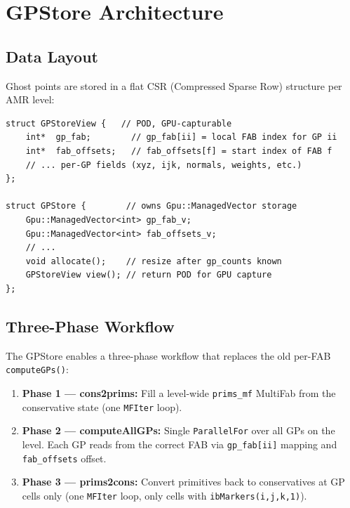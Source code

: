 \documentclass[11pt,a4paper]{article}
\begin{document}
\section{GPStore Architecture}

\subsection{Data Layout}

Ghost points are stored in a flat CSR (Compressed Sparse Row) structure
per AMR level:

\begin{lstlisting}[caption={GPStore CSR layout}]
struct GPStoreView {   // POD, GPU-capturable
    int*  gp_fab;        // gp_fab[ii] = local FAB index for GP ii
    int*  fab_offsets;   // fab_offsets[f] = start index of FAB f
    // ... per-GP fields (xyz, ijk, normals, weights, etc.)
};

struct GPStore {        // owns Gpu::ManagedVector storage
    Gpu::ManagedVector<int> gp_fab_v;
    Gpu::ManagedVector<int> fab_offsets_v;
    // ...
    void allocate();    // resize after gp_counts known
    GPStoreView view(); // return POD for GPU capture
};
\end{lstlisting}

\subsection{Three-Phase Workflow}

The GPStore enables a three-phase workflow that replaces the old per-FAB
\texttt{computeGPs()}:

\begin{enumerate}
  \item \textbf{Phase 1 --- cons2prims:}
    Fill a level-wide \texttt{prims\_mf} MultiFab from the conservative
    state (one \texttt{MFIter} loop).

  \item \textbf{Phase 2 --- computeAllGPs:}
    Single \texttt{ParallelFor} over all GPs on the level.  Each GP
    reads from the correct FAB via \texttt{gp\_fab[ii]} mapping and
    \texttt{fab\_offsets} offset.

  \item \textbf{Phase 3 --- prims2cons:}
    Convert primitives back to conservatives at GP cells only (one
    \texttt{MFIter} loop, only cells with \texttt{ibMarkers(i,j,k,1)}).
\end{enumerate}
\end{document}
